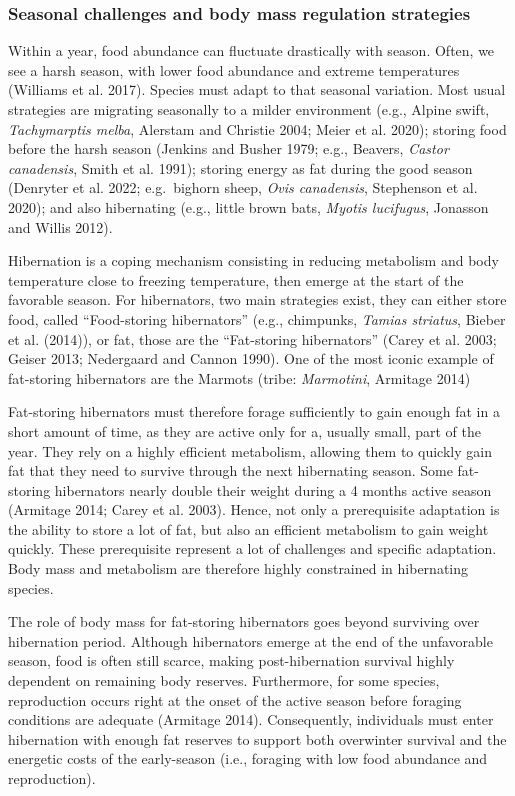 \documentclass[
  12pt,
  letterpaper,
]{scrartcl}
\begin{document}
\subsubsection{Seasonal challenges and body mass regulation
strategies}\label{seasonal-challenges-and-body-mass-regulation-strategies}

Within a year, food abundance can fluctuate drastically with season.
Often, we see a harsh season, with lower food abundance and extreme
temperatures (Williams et al. 2017). Species must adapt to that seasonal
variation. Most usual strategies are migrating seasonally to a milder
environment (e.g., Alpine swift, \emph{Tachymarptis melba}, Alerstam and
Christie 2004; Meier et al. 2020); storing food before the harsh season
(Jenkins and Busher 1979; e.g., Beavers, \emph{Castor canadensis}, Smith
et al. 1991); storing energy as fat during the good season (Denryter et
al. 2022; e.g.~bighorn sheep, \emph{Ovis canadensis}, Stephenson et al.
2020); and also hibernating (e.g., little brown bats, \emph{Myotis
lucifugus}, Jonasson and Willis 2012).

Hibernation is a coping mechanism consisting in reducing metabolism and
body temperature close to freezing temperature, then emerge at the start
of the favorable season. For hibernators, two main strategies exist,
they can either store food, called ``Food-storing hibernators'' (e.g.,
chimpunks, \emph{Tamias striatus}, Bieber et al. (2014)), or fat, those
are the ``Fat-storing hibernators'' (Carey et al. 2003; Geiser 2013;
Nedergaard and Cannon 1990). One of the most iconic example of
fat-storing hibernators are the Marmots (tribe: \emph{Marmotini},
Armitage 2014)

Fat-storing hibernators must therefore forage sufficiently to gain
enough fat in a short amount of time, as they are active only for a,
usually small, part of the year. They rely on a highly efficient
metabolism, allowing them to quickly gain fat that they need to survive
through the next hibernating season. Some fat-storing hibernators nearly
double their weight during a 4 months active season (Armitage 2014;
Carey et al. 2003). Hence, not only a prerequisite adaptation is the
ability to store a lot of fat, but also an efficient metabolism to gain
weight quickly. These prerequisite represent a lot of challenges and
specific adaptation. Body mass and metabolism are therefore highly
constrained in hibernating species.

The role of body mass for fat-storing hibernators goes beyond surviving
over hibernation period. Although hibernators emerge at the end of the
unfavorable season, food is often still scarce, making post-hibernation
survival highly dependent on remaining body reserves. Furthermore, for
some species, reproduction occurs right at the onset of the active
season before foraging conditions are adequate (Armitage 2014).
Consequently, individuals must enter hibernation with enough fat
reserves to support both overwinter survival and the energetic costs of
the early-season (i.e., foraging with low food abundance and
reproduction).
\end{document}
